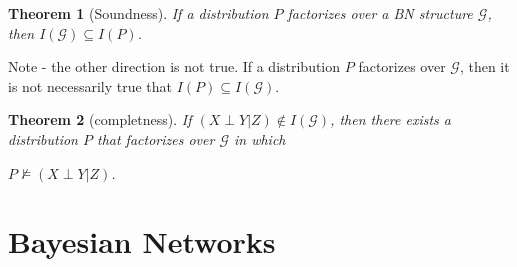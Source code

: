 \documentclass[11pt]{article}
\numberwithin{equation}{section}
\theoremstyle{boldStyle}
\theoremstyle{boldBlueStyle}
\theoremstyle{boldPurpleStyle}
\newtheorem{theorem}{Theorem}[section]
\theoremstyle{boldRedStyle}
\begin{document}
\begin{theorem}[Soundness]
    If a distribution $P$ factorizes over a BN structure $\mathcal{G}$, then $I(\mathcal{G}) \subseteq I(P)$.
\end{theorem}
Note - the other direction is not true. If a distribution $P$ factorizes over $\mathcal{G}$, then it is not necessarily true that $I(P) \subseteq I(\mathcal{G})$.

\begin{theorem}[completness]
    If $(X \perp Y | Z) \notin I(\mathcal{G})$, then there exists a distribution $P$ that factorizes over $\mathcal{G}$ in which 
    
    $P \not\models (X \perp Y | Z)$.
\end{theorem}




\newpage
\section{Bayesian Networks}
\end{document}
